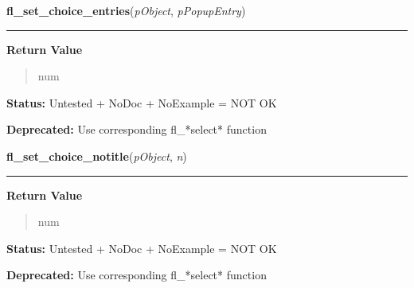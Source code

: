    \label{xformslib:library:fl_set_choice_entries}

    \vspace{0.5ex}

\hspace{.8\funcindent}\begin{boxedminipage}{\funcwidth}

    \raggedright \textbf{fl\_set\_choice\_entries}(\textit{pObject}, \textit{pPopupEntry})

    \vspace{-1.5ex}

    \rule{\textwidth}{0.5\fboxrule}
\setlength{\parskip}{2ex}
\setlength{\parskip}{1ex}
      \textbf{Return Value}
    \vspace{-1ex}

      \begin{quote}
      num

      \end{quote}

\textbf{Status:} Untested + NoDoc + NoExample = NOT OK



\textbf{Deprecated:} Use corresponding fl\_*select* function



    \end{boxedminipage}

    \label{xformslib:library:fl_set_choice_notitle}

    \vspace{0.5ex}

\hspace{.8\funcindent}\begin{boxedminipage}{\funcwidth}

    \raggedright \textbf{fl\_set\_choice\_notitle}(\textit{pObject}, \textit{n})

    \vspace{-1.5ex}

    \rule{\textwidth}{0.5\fboxrule}
\setlength{\parskip}{2ex}
\setlength{\parskip}{1ex}
      \textbf{Return Value}
    \vspace{-1ex}

      \begin{quote}
      num

      \end{quote}

\textbf{Status:} Untested + NoDoc + NoExample = NOT OK



\textbf{Deprecated:} Use corresponding fl\_*select* function



    \end{boxedminipage}

